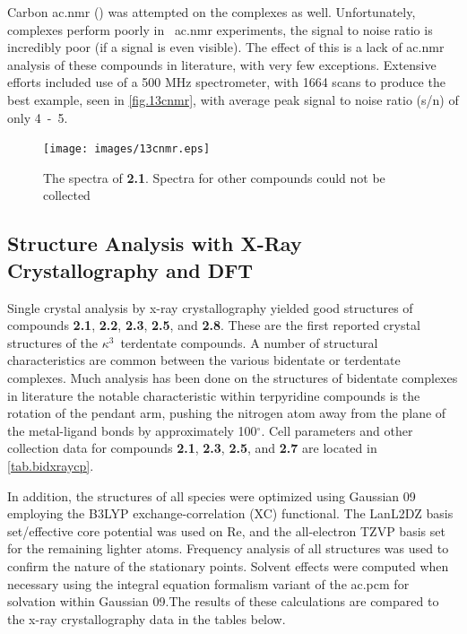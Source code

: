 Carbon \gls{ac.nmr} () was attempted on the complexes as well. Unfortunately,  complexes perform poorly in ~\gls{ac.nmr} experiments, the signal to noise ratio is incredibly poor (if a signal is even visible). The effect of this is a lack of  \gls{ac.nmr} analysis of these compounds in literature, with very few exceptions\autocite{morimoto2013}. Extensive efforts included use of a 500 MHz spectrometer, with 1664 scans to produce the best example, seen in \autoref{fig.13cnmr}, with average peak signal to noise ratio (s/n) of only 4~-~5.

\begin{figure}[!htb]
 \begin{center}
  \texttt{[image: images/13cnmr.eps]}
 \end{center}
\caption[The 13C  spectra of \textbf{2.1}]{The   spectra of \textbf{2.1}. Spectra for other compounds could not be collected}
\label{fig.13cnmr}
\end{figure} 

\FloatBarrier

\subsection{Structure Analysis with X-Ray Crystallography and DFT}\label{ss.xray}

Single crystal analysis by x-ray crystallography yielded good structures of compounds \textbf{2.1}, \textbf{2.2}, \textbf{2.3}, \textbf{2.5}, and \textbf{2.8}. These are the first reported crystal structures of the $\kappa^3$~terdentate  compounds. A number of structural characteristics are common between the various bidentate or terdentate complexes. Much analysis has been done on the structures of bidentate complexes in literature\autocite{anderson1990, civitello1993, kurz2006} the notable characteristic within terpyridine compounds is the rotation of the pendant arm, pushing the nitrogen atom away from the plane of the metal-ligand bonds by approximately 100$^\circ$. Cell parameters and other collection data for compounds \textbf{2.1}, \textbf{2.3}, \textbf{2.5}, and \textbf{2.7} are located in \autoref{tab.bidxraycp}.



In addition, the structures of all species were optimized using Gaussian 09\autocite{gaussian} employing the B3LYP\autocite{becke1993, lee1988}  exchange-correlation (XC) functional. The LanL2DZ basis set/effective core potential was used on Re\autocite{hay1985}, and the all-electron TZVP basis set for the remaining lighter atoms\autocite{schafer1994}. Frequency analysis of all structures was used to confirm the nature of the stationary points. Solvent effects were computed when necessary using the integral equation formalism variant of the \gls{ac.pcm} for solvation within Gaussian 09\autocite{tomasi2005, scalmani2006}.The results of these calculations are compared to the x-ray crystallography data in the tables below.

